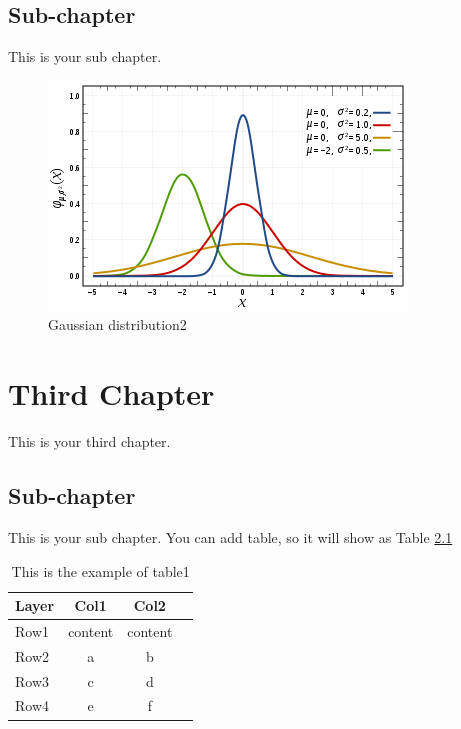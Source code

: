 \documentclass[12pt, twoside , openright]{book}
\begin{document}
\section{Sub-chapter}\label{sub_chapter}
This is your sub chapter. \blindtext[2]
\begin{figure}[h]
	\centerline{\includegraphics[width=0.5\columnwidth]{Images/gambar.png}}
	\caption{Gaussian distribution2}
	\label{fig:figure_ref2}
\end{figure}




\chapter{Third Chapter}
This is your third chapter. \blindtext[1] 

\section{Sub-chapter}\label{sub_chapter}
This is your sub chapter. \blindtext[1] You can add table, so it will show as Table \ref{table:table1}

\begin{table}[h!]
	\begin{center}
		\caption{This is the example of table1}
		\label{table:table1}
		\begin{tabular}{|l|c|c|c|}
			\hline
			\textbf{Layer} & \textbf{Col1} & \textbf{Col2} \\ %
			\hline
			Row1 & content & content \\ %
			Row2 & a & b \\ %
			Row3 & c & d \\ %
			Row4 & e & f \\ %
			\hline
		\end{tabular}
	\end{center}
\end{table}
\end{document}
